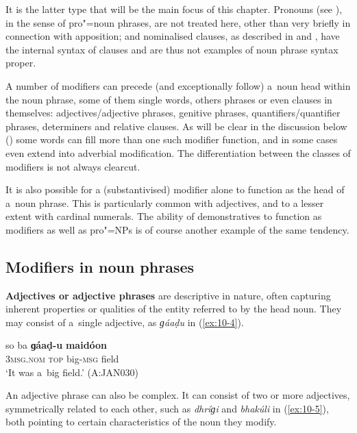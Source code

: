 It is the latter type that will be the main focus of this chapter. Pronouns (see ), in the sense of pro"=noun phrases, are not treated here, other than very briefly in connection with apposition; and nominalised clauses, as described in  and , have the internal syntax of clauses and are thus not examples of noun phrase syntax proper. 


A number of modifiers can precede (and exceptionally follow) a~noun head within the noun phrase, some of them single words, others phrases or even clauses in themselves: adjectives/adjective phrases, genitive phrases, quantifiers/{\allowbreak}quantifier phrases, determiners and relative clauses. As will be clear in the discussion below () some words can fill more than one such modifier function, and in some cases even extend into adverbial modification. The differentiation between the classes of modifiers is not always clearcut.


It is also possible for a (substantivised) modifier alone to function as the head of a~noun phrase. This is particularly common with adjectives, and to a lesser extent with cardinal numerals. The ability of demonstratives to function as modifiers as well as pro"=NPs is of course another example of the same tendency.


\subsection{Modifiers in noun phrases}
\label{subsec:10-1-2}


\textbf{Adjectives or adjective phrases} are descriptive in nature, often capturing inherent properties or qualities of the entity referred to by the head noun. They may consist of a~single adjective, as \textit{ɡáaḍu} in (\ref{ex:10-4}).

\begin{exe}
\ex
\label{ex:10-4}
\gll so ba \textbf{ɡáaḍ-u} \textbf{maidóon} \\
\textsc{3msg.nom} \textsc{top} big-\textsc{msg} field \\
\glt `It was a~big field.' (A:JAN030)
\end{exe}

An adjective phrase can also be complex. It can consist of two or more adjectives, symmetrically related to each other, such as \textit{dhríɡi} and \textit{bhakúli} in (\ref{ex:10-5}), both pointing to certain characteristics of the noun they modify. 

